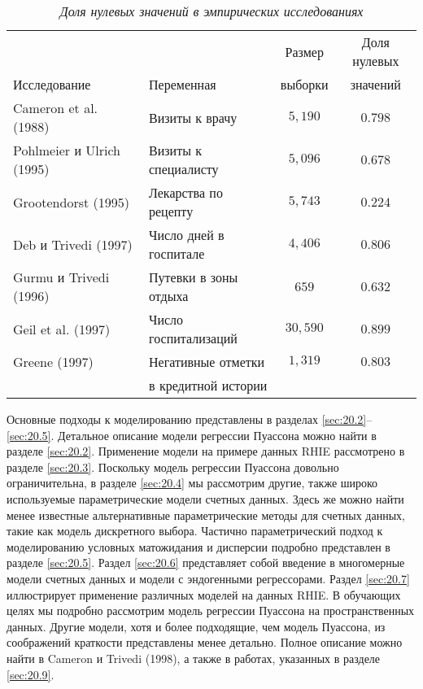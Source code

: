     \begin{table}[!ht]\caption{\textit{Доля нулевых значений в эмпирических исследованиях}}\label{tab:20.1}
    \begin{center}
\begin{tabular}{llcc}
\hline \hline
                          &               &Размер         &Доля нулевых\\
Исследование              &Переменная     &выборки        &значений\\
\hline
Cameron et al. (1988)     &Визиты к врачу&$5,190$&$0.798$\\
Pohlmeier и Ulrich (1995) &Визиты к специалисту&$5,096$&$0.678$\\
Grootendorst (1995)       &Лекарства по рецепту&$5,743$&$0.224$\\
Deb и Trivedi (1997)      &Число дней в госпитале&$4,406$&$0.806$\\
Gurmu и Trivedi (1996)    &Путевки в зоны отдыха&$659$&$0.632$\\
Geil et al. (1997)        &Число госпитализаций&$30,590$&$0.899$\\
Greene (1997)             &Негативные отметки&$1,319$&$0.803$\\
                          &в кредитной истории&&\\
\hline \hline
    \end{tabular}
    \end{center}
    \end{table}

Основные подходы к моделированию представлены в разделах \ref{sec:20.2}--\ref{sec:20.5}. Детальное описание модели регрессии Пуассона можно найти в разделе \ref{sec:20.2}. Применение модели на примере данных RHIE рассмотрено в разделе \ref{sec:20.3}. Поскольку модель регрессии Пуассона довольно ограничительна, в разделе \ref{sec:20.4} мы рассмотрим другие, также широко используемые параметрические модели счетных данных. Здесь же можно найти менее известные альтернативные параметрические методы для счетных данных, такие как модель дискретного выбора. Частично параметрический подход к моделированию условных матожидания и дисперсии подробно представлен в разделе \ref{sec:20.5}. Раздел \ref{sec:20.6} представляет собой введение в многомерные модели счетных данных и модели с эндогенными регрессорами. Раздел \ref{sec:20.7} иллюстрирует применение различных моделей на данных RHIE. В обучающих целях мы подробно рассмотрим модель регрессии Пуассона на пространственных данных.  Другие модели, хотя и более подходящие, чем модель Пуассона, из соображений краткости представлены менее детально. Полное описание можно найти в Cameron и Trivedi (1998), а также в работах, указанных в разделе \ref{sec:20.9}.




